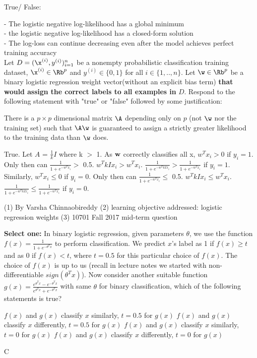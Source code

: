 \begin{questions}
\question 

True/ False: 

- The logistic negative log-likelihood has a global minimum \\
- the logistic negative log-likelihood has a closed-form solution \\
- The log-loss can continue decreasing even after the model achieves perfect training accuracy \\

\question [] Let $D = {(\x^{(i)},y^{(i)}})_{i=1}^n$ be a nonempty probabilistic classification training dataset, $\x^{(i)} \in \Rb^p$ and $y^{(i)} \in \{0,1\}$ for all $i \in \{1,..,n\}$. Let $\w \in \Rb^p$ be a binary logistic regression weight vector(without an explicit bias term) \textbf{that would assign the correct labels to all examples in} $D$. Respond to the following statement with "true" or "false" followed by some justification:

There is a $p \times p$ dimensional matrix $\A$ depending only on $p$ (not $\w$ nor the training set) such that $\A\w$ is guaranteed to assign a strictly greater likelihood to the training data than $\w$ does.
    
    \begin{soln}
    True. Let $A$ = $\frac{1}{k}I$ where k $>$ 1. As $\bold{w}$ correctly classifies all x, $w^T x_i>0$ if $y_i=1$. Only then can $\frac{1}{1+e^{-w^T x_i}}>$ 0.5. $w^T kIx_i>w^Tx_i$. $\frac{1}{1+e^{-w^TkI x_i}}>\frac{1}{1+e^{-w^T x_i}}$ if $y_i=1$. Similarly, $w^T x_i\leq0$ if $y_i=0$. Only then can $\frac{1}{1+e^{-w^T x_i}}\leq$ 0.5. $w^T kIx_i\leq w^Tx_i$. $\frac{1}{1+e^{-w^TkI x_i}}\leq \frac{1}{1+e^{-w^T x_i}}$ if $y_i=0$.
    \end{soln}
    
    \begin{qauthor}
    (1) By Varsha Chinnaobireddy
    (2) learning objective addressed: logistic regression weights
    (3) 10701 Fall 2017 mid-term question
    \end{qauthor}

\question [] \textbf{Select one:} In binary logistic regression, given parameters $\theta$, we use the function $f(x) = \frac{1}{1+e^{-\theta^{T}x}}$ to perform classification. We predict $x$'s label as 1 if $f(x) \geq t$ and as 0 if $f(x) < t$, where $t=0.5$ for this particular choice of $f(x)$. The choice of $f(x)$ is up to us (recall in lecture notes we started with non-differentiable $sign(\theta^Tx)$). Now consider another suitable function $g(x) = \frac{e^{\theta^{T}x} - e^{-\theta^{T}x}}{e^{\theta^{T}x} + e^{-\theta^{T}x}}$ with same $\theta$ for binary classification, which of the following statements is true?  
    {%
    \begin{checkboxes}
     \choice $f(x)$ and $g(x)$ classify $x$ similarly, $t = 0.5$ for $g(x)$
     \choice $f(x)$ and $g(x)$ classify $x$ differently, $t = 0.5$ for $g(x)$
     \choice $f(x)$ and $g(x)$ classify $x$ similarly, $t = 0$ for $g(x)$
     \choice $f(x)$ and $g(x)$ classify $x$ differently, $t = 0$ for $g(x)$
    \end{checkboxes}
    }
    \begin{soln}
    C
    

\end{soln}
\end{questions}
